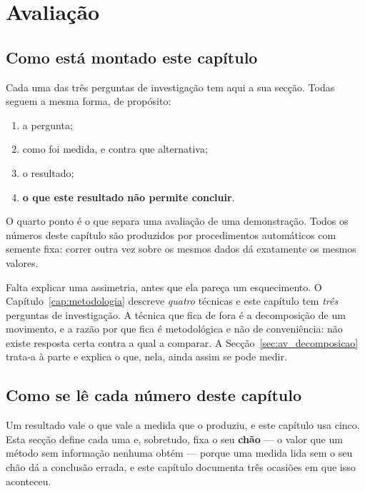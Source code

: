 
\chapter{Avaliação}
\label{cap:avaliacao}

\section{Como está montado este capítulo}
\label{sec:av_montagem}

Cada uma das três perguntas de investigação tem aqui a sua secção. Todas seguem a mesma forma, de
propósito:

\begin{enumerate}
  \item a pergunta;
  \item como foi medida, e contra que alternativa;
  \item o resultado;
  \item \textbf{o que este resultado não permite concluir}.
\end{enumerate}

O quarto ponto é o que separa uma avaliação de uma demonstração. Todos os números deste capítulo são
produzidos por procedimentos automáticos com semente fixa: correr outra vez sobre os mesmos dados dá
exatamente os mesmos valores.

Falta explicar uma assimetria, antes que ela pareça um esquecimento. O
Capítulo~\ref{cap:metodologia} descreve \emph{quatro} técnicas e este capítulo tem \emph{três}
perguntas de investigação. A técnica que fica de fora é a decomposição de um movimento, e a razão
por que fica é metodológica e não de conveniência: não existe resposta certa contra a qual a
comparar. A Secção~\ref{sec:av_decomposicao} trata-a à parte e explica o que, nela, ainda assim se
pode medir.

\section{Como se lê cada número deste capítulo}
\label{sec:av_metricas}

Um resultado vale o que vale a medida que o produziu, e este capítulo usa cinco. Esta secção define
cada uma e, sobretudo, fixa o seu \textbf{chão} --- o valor que um método sem informação nenhuma
obtém --- porque uma medida lida sem o seu chão dá a conclusão errada, e este capítulo documenta
três ocasiões em que isso aconteceu.

